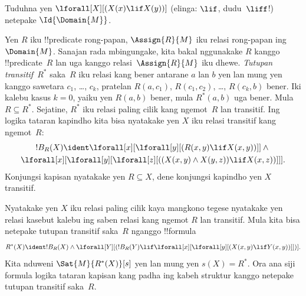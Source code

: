 \documentclass[../../../include/open-logic-section]{subfiles}
\begin{document}
\begin{prob}
Tuduhna yen $\lforall[X][(X(x) \lif X(y))]$ (elinga:
$\lif$, dudu~$\liff$!) netepake $\Id{\Domain{M}}$.
\end{prob}

\begin{ex}
Yen $R$ iku !!{predicate} rong-papan, $\Assign{R}{M}$ iku
relasi rong-papan ing~$\Domain{M}$. Sanajan rada mbingungake,
kita bakal nggunakake $R$ kanggo !!{predicate}~$R$ lan uga
kanggo relasi~$\Assign{R}{M}$ iku dhewe. \emph{Tutupan
transitif}~$R^*$ saka~$R$ iku relasi kang bener antarane
$a$ lan $b$ yen lan mung yen kanggo sawetara $c_1$, \dots,
$c_k$, pratelan $R(a,c_1)$, $R(c_1, c_2)$, \dots,
$R(c_k,b)$ bener. Iki kalebu kasus $k = 0$, yaiku yen
$R(a,b)$ bener, mula $R^*(a,b)$ uga bener. Mula
$R \subseteq R^*$. Sejatine, $R^*$ iku relasi paling cilik
kang ngemot~$R$ lan transitif. Ing logika tataran kapindho kita
bisa nyatakake yen $X$ iku relasi transitif kang ngemot~$R$:
\begin{multline*}
  !B_R(X) \ident \lforall[x][\lforall[y][(R(x,y) \lif X(x, y))]] \land {}\\
\lforall[x][\lforall[y][\lforall[z][((X(x,y) \land X(y,z)) \lif X(x,
      z))]]].
\end{multline*}
Konjungsi kapisan nyatakake yen $R \subseteq X$, dene
konjungsi kapindho yen $X$ transitif.

Nyatakake yen $X$ iku relasi paling cilik kaya mangkono
tegese nyatakake yen relasi kasebut kalebu ing saben relasi kang ngemot
$R$ lan transitif. Mula kita bisa netepake tutupan transitif
saka~$R$ nganggo !!{formula}
\[
R^*(X) \ident !B_R(X) \land \lforall[Y][(!B_R(Y) \lif
  \lforall[x][\lforall[y][(X(x, y) \lif Y(x,y))]])].
\]
Kita nduweni $\Sat{M}{R^*(X)}[s]$ yen lan mung yen
$s(X) = R^*$. Ora ana siji formula logika tataran kapisan kang padha ing kabeh struktur kanggo netepake tutupan transitif saka~$R$.
\end{ex}
\end{document}
